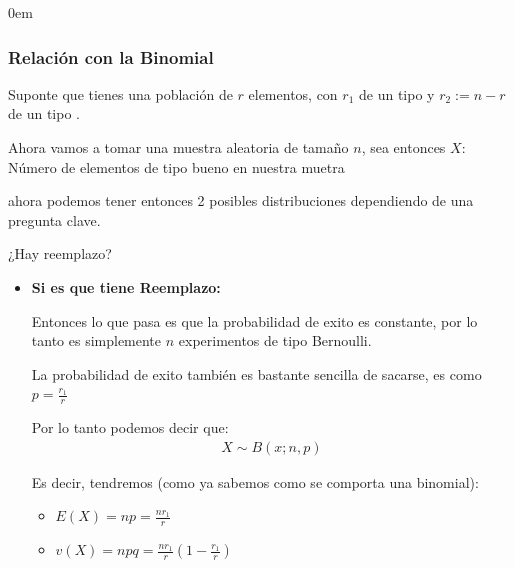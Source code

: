 \documentclass[12pt, fleqn]{report}                             %
\newenvironment{SmallIndentation}[1][0.75em]                    %
        {\begin{adjustwidth}{#1}{}\begin{footnotesize}}             %
        {\end{footnotesize}\end{adjustwidth}}                       %
\newcommand \Quote              {\qq}                           %
\theoremstyle{break}                                            %
\newcommand{\Wrap}[1]           {\left( #1 \right)}             %
\begin{document}
                \begin{multicols*}{2}
                \begin{SmallIndentation}[0em]

                    \subsubsection{Relación con la Binomial}

                        Suponte que tienes una población de $r$ elementos, con $r_1$ de un tipo \Quote{bueno}
                        y $r_2 := n - r$ de un tipo \Quote{malo}.

                        Ahora vamos a tomar una muestra aleatoria de tamaño $n$,
                        sea entonces $X : $ Número de elementos de tipo bueno en nuestra muetra 

                        ahora podemos tener
                        entonces 2 posibles distribuciones dependiendo de una pregunta clave.

                        ¿Hay reemplazo?

                        \begin{itemize}
                            \item 
                                \textbf{Si es que tiene Reemplazo:}

                                Entonces lo que pasa es que la probabilidad de exito es constante, por 
                                lo tanto es simplemente $n$ experimentos de tipo Bernoulli.

                                La probabilidad de exito también es bastante sencilla de sacarse, es
                                como $p = \frac{r_1}{r}$

                                Por lo tanto podemos decir que:
                                \begin{align*}
                                    X \sim B(x; n, p)
                                \end{align*}

                                Es decir, tendremos (como ya sabemos como se comporta una binomial):
                                \begin{itemize}
                                    \item $E(X) = np = \frac{nr_1}{r}$
                                    \item $v(X) = npq = \frac{nr_1}{r}\Wrap{1 - \frac{r_1}{r}}$
                                \end{itemize}


\end{itemize}
\end{SmallIndentation}
\end{multicols*}
\end{document}
